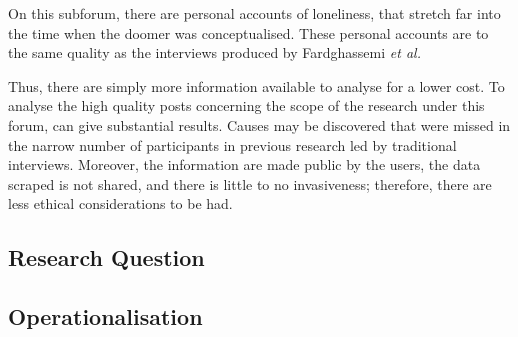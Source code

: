 \documentclass{article}
\begin{document}
On this subforum, there are personal accounts of loneliness, that stretch far into the time when the doomer was conceptualised. 
These personal accounts are to the same quality as the interviews produced by Fardghassemi \textit{et al.}

Thus, there are simply more information available to analyse for a lower cost. To analyse the high quality posts concerning the scope of the research under this forum, can give substantial results.
Causes may be discovered that were missed in the narrow number of participants in previous research led by traditional interviews.
Moreover, the information are made public by the users, the data scraped is not shared, and there is little to no invasiveness; therefore, there are less ethical considerations to be had.

\subsection{Research Question}

\subsection{Operationalisation}
\end{document}
